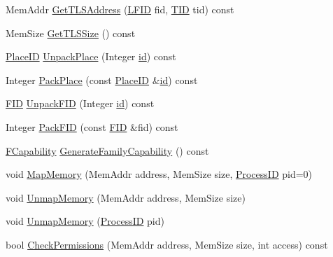 \begin{DoxyCompactItemize}
Mem\+Addr \hyperlink{class_simulator_1_1_d_r_i_s_c_adb723c225728b9a13e34e410e3bf3d19}{Get\+T\+L\+S\+Address} (\hyperlink{namespace_simulator_aaccbc706b2d6c99085f52f6dfc2333e4}{L\+F\+I\+D} fid, \hyperlink{namespace_simulator_a483cc4ecee1736e895054617672cded5}{T\+I\+D} tid) const 
\item 
Mem\+Size \hyperlink{class_simulator_1_1_d_r_i_s_c_af58119afa0433cde6ea8cafdc1c522fe}{Get\+T\+L\+S\+Size} () const 
\item 
\hyperlink{struct_simulator_1_1_place_i_d}{Place\+I\+D} \hyperlink{class_simulator_1_1_d_r_i_s_c_a8192f04888fbc90e4c0d9e75cab1d1f3}{Unpack\+Place} (Integer \hyperlink{mtconf_8c_aa3185401f04d30bd505daebf48c39cc5}{id}) const 
\item 
Integer \hyperlink{class_simulator_1_1_d_r_i_s_c_a24419ce6a407d7901c7bf839fc12da0d}{Pack\+Place} (const \hyperlink{struct_simulator_1_1_place_i_d}{Place\+I\+D} \&\hyperlink{mtconf_8c_aa3185401f04d30bd505daebf48c39cc5}{id}) const 
\item 
\hyperlink{struct_simulator_1_1_f_i_d}{F\+I\+D} \hyperlink{class_simulator_1_1_d_r_i_s_c_afa83a50bf057b50fbe0d48534cb2f8cb}{Unpack\+F\+I\+D} (Integer \hyperlink{mtconf_8c_aa3185401f04d30bd505daebf48c39cc5}{id}) const 
\item 
Integer \hyperlink{class_simulator_1_1_d_r_i_s_c_a2cbfbfe068dc55e9bcbf4eb977b07732}{Pack\+F\+I\+D} (const \hyperlink{struct_simulator_1_1_f_i_d}{F\+I\+D} \&fid) const 
\item 
\hyperlink{namespace_simulator_a607aa9969bfe2711861ae21f42c37c59}{F\+Capability} \hyperlink{class_simulator_1_1_d_r_i_s_c_a2bf1a019a4cc003b77b3f278f3b8b1c6}{Generate\+Family\+Capability} () const 
\item 
void \hyperlink{class_simulator_1_1_d_r_i_s_c_a2ff0805fbd40c1c4c3b59c42fe2682ce}{Map\+Memory} (Mem\+Addr address, Mem\+Size size, \hyperlink{namespace_simulator_a62ef2d2c77bd54a16c39881f6266875e}{Process\+I\+D} pid=0)
\item 
void \hyperlink{class_simulator_1_1_d_r_i_s_c_a908571cb361eef6c9c066c25d27e856b}{Unmap\+Memory} (Mem\+Addr address, Mem\+Size size)
\item 
void \hyperlink{class_simulator_1_1_d_r_i_s_c_a7505ae756c446337a20cacb2064d407d}{Unmap\+Memory} (\hyperlink{namespace_simulator_a62ef2d2c77bd54a16c39881f6266875e}{Process\+I\+D} pid)
\item 
bool \hyperlink{class_simulator_1_1_d_r_i_s_c_af68786ce2d6ddb1fe768317cf8b50006}{Check\+Permissions} (Mem\+Addr address, Mem\+Size size, int access) const 
\item 

\end{DoxyCompactItemize}
